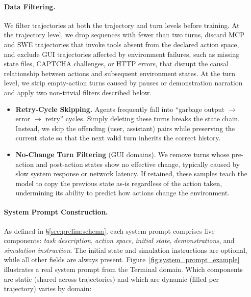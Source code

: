 \documentclass{llmxive}
\begin{document}
\paragraph{Data Filtering.}
We filter trajectories at both the trajectory and turn levels before training.
At the trajectory level, we drop sequences with fewer than two turns, discard MCP and SWE trajectories that invoke tools absent from the declared action space, and exclude GUI trajectories affected by environment failures, such as missing state files, CAPTCHA challenges, or HTTP errors, that disrupt the causal relationship between actions and subsequent environment states.
At the turn level, we strip empty-action turns caused by pauses or demonstration narration and apply two non-trivial filters described below.

\begin{itemize}[leftmargin=1.5em,itemsep=2pt]
    \item \textbf{Retry-Cycle Skipping.}
    Agents frequently fall into ``garbage output $\to$ error $\to$ retry'' cycles.
    Simply deleting these turns breaks the state chain. Instead, we skip the offending (user, assistant) pairs while preserving the current state so that the next valid turn inherits the correct history.

    \item \textbf{No-Change Turn Filtering} (GUI domains).
    We remove turns whose pre-action and post-action states show no effective change, typically caused by slow system response or network latency.
    If retained, these samples teach the model to copy the previous state as-is regardless of the action taken, undermining its ability to predict how actions change the environment.
\end{itemize}


\paragraph{System Prompt Construction.}
\label{sec:pipeline:prompt}
As defined in \S\ref{sec:prelim:schema}, each system prompt comprises five components: \emph{task description}, \emph{action space}, \emph{initial state}, \emph{demonstrations}, and \emph{simulation instruction}.
The initial state and simulation instructions are optional, while all other fields are always present.
Figure~\ref{fig:system_prompt_example} illustrates a real system prompt from the Terminal domain.
Which components are static (shared across trajectories) and which are dynamic (filled per trajectory) varies by domain:
\end{document}
